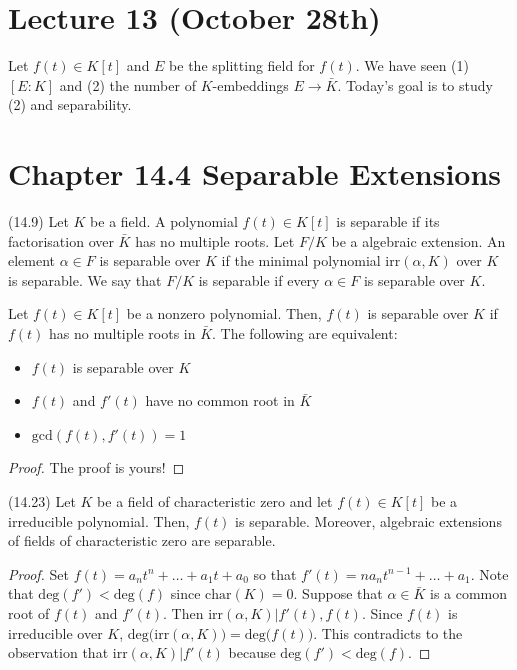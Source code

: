 \section{Lecture 13 (October 28th)}
\begin{recall}
Let $f(t)\in K[t]$ and $E$ be the splitting field for $f(t)$. We have seen (1) $[E:K]$ and (2) the number of $K$-embeddings $E\rightarrow \bar{K}$. Today's goal is to study (2) and separability. 
\end{recall}
\vspace{2ex}
\section{Chapter 14.4 Separable Extensions}
\begin{defi}
(14.9) Let $K$ be a field. A polynomial $f(t)\in K[t]$ is separable if its factorisation over $\bar{K}$ has no multiple roots. Let $F/K$ be a algebraic extension. An element $\alpha \in F$ is separable over $K$ if the minimal polynomial $\mathrm{irr}(\alpha ,K)$ over $K$ is separable. We say that $F/K$ is separable if every $\alpha \in F$ is separable over $K$. 
\end{defi}
\vspace{2ex}
\begin{prop}
Let $f(t)\in K[t]$ be a nonzero polynomial. Then, $f(t)$ is separable over $K$ if $f(t)$ has no multiple roots in $\bar{K}$. The following are equivalent:
\begin{itemize}
\item[(i)] $f(t)$ is separable over $K$
\item[(ii)] $f(t)$ and $f'(t)$ have no common root in $\bar{K}$
\item[(iii)] $\mathrm{gcd}(f(t),f'(t))=1$
\end{itemize}
\end{prop}
\vspace{2ex}
\begin{proof}
The proof is yours!
\end{proof}
\vspace{2ex}
\begin{prop}
(14.23) Let $K$ be a field of characteristic zero and let $f(t)\in K[t]$ be a irreducible polynomial. Then, $f(t)$ is separable. Moreover, algebraic extensions of fields of characteristic zero are separable.
\end{prop}
\vspace{2ex}
\begin{proof}
Set $f(t)=a_{n}t^{n}+\ldots +a_1t+a_0$ so that $f'(t)=na_{n}t^{n-1}+\ldots +a_1$. Note that $\mathrm{deg}(f')<\mathrm{deg}(f)$ since $\mathrm{char}(K)=0$. Suppose that $\alpha \in \bar{K}$ is a common root of $f(t)$ and $f'(t)$. Then $\mathrm{irr}(\alpha ,K)|f'(t),f(t)$. Since $f(t)$ is irreducible over $K$, $\mathrm{deg}\big(\mathrm{irr}(\alpha ,K)\big)=\mathrm{deg}\big(f(t)\big)$. This contradicts to the observation that $\mathrm{irr}(\alpha ,K)| f'(t)$ because $\mathrm{deg}(f')<\mathrm{deg}(f)$. 
\end{proof}
